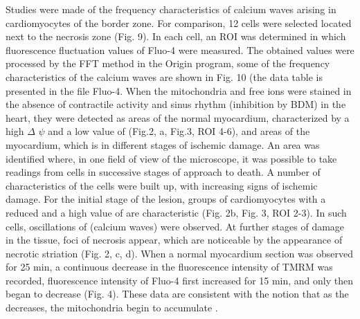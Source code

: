 \documentclass{biophys-new}
\begin{document}
Studies were made of the frequency characteristics of calcium waves arising in cardiomyocytes of the border zone. For comparison, 12 cells were selected located next to the necrosis zone (Fig. 9). In each cell, an ROI was determined in which fluorescence fluctuation values of Fluo-4 were measured. The obtained values were processed by the FFT method in the Origin program, some of the frequency characteristics of the calcium waves are shown in Fig. 10 (the data table is presented in the file Fluo-4.
When the mitochondria and free  ions were stained in the absence of contractile activity and sinus rhythm (inhibition by BDM) in the heart, they were detected as areas of the normal myocardium, characterized by a high $\Delta$ $\psi$ and a low value of  (Fig.2, a, Fig.3, ROI 4-6), and areas of the myocardium, which is in different stages of ischemic damage.
An area was identified where, in one field of view of the microscope, it was possible to take readings from cells in successive stages of approach to death. A number of characteristics of the cells were built up, with increasing signs of ischemic damage.
For the initial stage of the lesion, groups of cardiomyocytes with a reduced and a high value of  are characteristic (Fig. 2b, Fig. 3, ROI 2-3). In such cells, oscillations of  (calcium waves) were observed. At further stages of damage in the tissue, foci of necrosis appear, which are noticeable by the appearance of necrotic striation (Fig. 2, c, d). When a normal myocardium section was observed for 25 min, a continuous decrease in the fluorescence intensity of TMRM was recorded, fluorescence intensity of Fluo-4 first increased for 15 min, and only then began to decrease (Fig. 4). These data are consistent with the notion that as the decreases, the mitochondria begin to accumulate .


\end{document}
